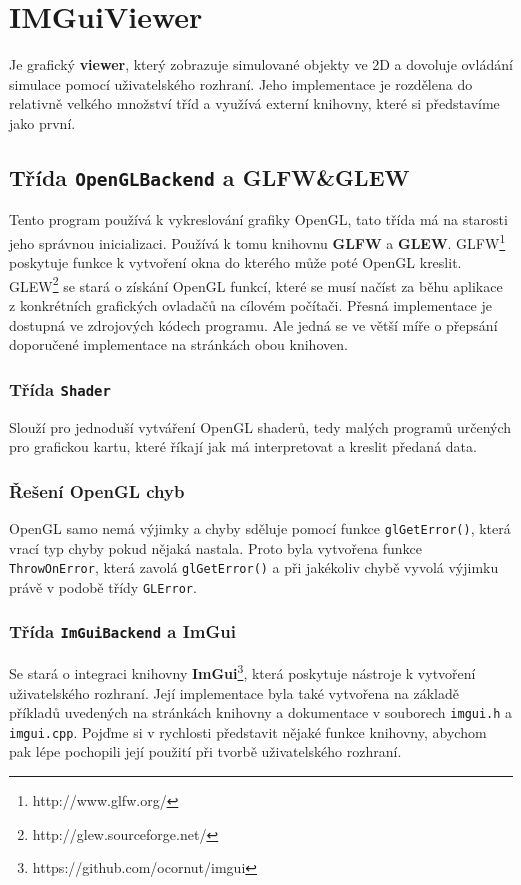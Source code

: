\chapter{IMGuiViewer}
Je grafický \textbf{viewer}, který zobrazuje simulované objekty ve 2D a dovoluje ovládání simulace pomocí uživatelského rozhraní. Jeho implementace je rozdělena do relativně velkého množství tříd a využívá externí knihovny, které si představíme jako první.

\section{Třída \texttt{OpenGLBackend} a GLFW\&GLEW}
Tento program používá k vykreslování grafiky OpenGL, tato třída má na starosti jeho správnou inicializaci. Používá k tomu knihovnu \textbf{GLFW} a \textbf{GLEW}.
GLFW\footnote{http://www.glfw.org/} poskytuje funkce k vytvoření okna do kterého může poté OpenGL kreslit.
GLEW\footnote{http://glew.sourceforge.net/} se stará o získání OpenGL funkcí, které se musí načíst za běhu aplikace z konkrétních grafických ovladačů na cílovém počítači.
Přesná implementace je dostupná ve zdrojových kódech programu. Ale jedná se ve větší míře o přepsání doporučené implementace na stránkách obou knihoven.

\subsection{Třída \texttt{Shader}}
Slouží pro jednoduší vytváření OpenGL shaderů, tedy malých programů určených pro grafickou kartu, které říkají jak má interpretovat a kreslit předaná data.
\subsection{Řešení OpenGL chyb} 
OpenGL samo nemá výjimky a chyby sděluje pomocí funkce \texttt{glGetError()}, která vrací typ chyby pokud nějaká nastala. Proto byla vytvořena funkce \texttt{ThrowOnError}, která zavolá \texttt{glGetError()} a při jakékoliv chybě vyvolá výjimku právě v podobě třídy \texttt{GLError}.
\subsection{Třída \texttt{ImGuiBackend} a ImGui}
Se stará o integraci knihovny \textbf{ImGui}\footnote{https://github.com/ocornut/imgui}, která poskytuje nástroje k vytvoření uživatelského rozhraní.
Její implementace byla také vytvořena na základě příkladů uvedených na stránkách knihovny a dokumentace v souborech \texttt{imgui.h} a \texttt{imgui.cpp}. 
Pojďme si v rychlosti představit nějaké funkce knihovny, abychom pak lépe pochopili její použití při tvorbě uživatelského rozhraní.

